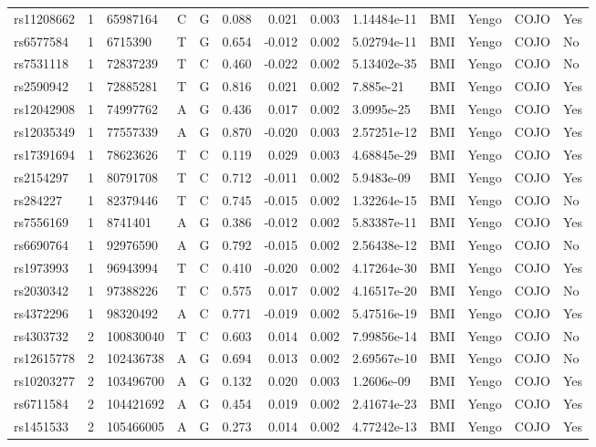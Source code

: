 \documentclass[11pt,twoside]{bristolthesis}
\begin{document}
\begin{longtable}[t]{lrlllrrrlllll}
rs11208662 & 1 & 65987164 & C & G & 0.088 & 0.021 & 0.003 & 1.14484e-11 & BMI & Yengo & COJO & Yes\\
\addlinespace
rs6577584 & 1 & 6715390 & T & G & 0.654 & -0.012 & 0.002 & 5.02794e-11 & BMI & Yengo & COJO & No\\
rs7531118 & 1 & 72837239 & T & C & 0.460 & -0.022 & 0.002 & 5.13402e-35 & BMI & Yengo & COJO & No\\
rs2590942 & 1 & 72885281 & T & G & 0.816 & 0.021 & 0.002 & 7.885e-21 & BMI & Yengo & COJO & Yes\\
rs12042908 & 1 & 74997762 & A & G & 0.436 & 0.017 & 0.002 & 3.0995e-25 & BMI & Yengo & COJO & Yes\\
rs12035349 & 1 & 77557339 & A & G & 0.870 & -0.020 & 0.003 & 2.57251e-12 & BMI & Yengo & COJO & Yes\\
\addlinespace
rs17391694 & 1 & 78623626 & T & C & 0.119 & 0.029 & 0.003 & 4.68845e-29 & BMI & Yengo & COJO & Yes\\
rs2154297 & 1 & 80791708 & T & C & 0.712 & -0.011 & 0.002 & 5.9483e-09 & BMI & Yengo & COJO & Yes\\
rs284227 & 1 & 82379446 & T & C & 0.745 & -0.015 & 0.002 & 1.32264e-15 & BMI & Yengo & COJO & No\\
rs7556169 & 1 & 8741401 & A & G & 0.386 & -0.012 & 0.002 & 5.83387e-11 & BMI & Yengo & COJO & Yes\\
rs6690764 & 1 & 92976590 & A & G & 0.792 & -0.015 & 0.002 & 2.56438e-12 & BMI & Yengo & COJO & No\\
\addlinespace
rs1973993 & 1 & 96943994 & T & C & 0.410 & -0.020 & 0.002 & 4.17264e-30 & BMI & Yengo & COJO & Yes\\
rs2030342 & 1 & 97388226 & T & C & 0.575 & 0.017 & 0.002 & 4.16517e-20 & BMI & Yengo & COJO & No\\
rs4372296 & 1 & 98320492 & A & C & 0.771 & -0.019 & 0.002 & 5.47516e-19 & BMI & Yengo & COJO & Yes\\
rs4303732 & 2 & 100830040 & T & C & 0.603 & 0.014 & 0.002 & 7.99856e-14 & BMI & Yengo & COJO & No\\
rs12615778 & 2 & 102436738 & A & G & 0.694 & 0.013 & 0.002 & 2.69567e-10 & BMI & Yengo & COJO & No\\
\addlinespace
rs10203277 & 2 & 103496700 & A & G & 0.132 & 0.020 & 0.003 & 1.2606e-09 & BMI & Yengo & COJO & Yes\\
rs6711584 & 2 & 104421692 & A & G & 0.454 & 0.019 & 0.002 & 2.41674e-23 & BMI & Yengo & COJO & Yes\\
rs1451533 & 2 & 105466005 & A & G & 0.273 & 0.014 & 0.002 & 4.77242e-13 & BMI & Yengo & COJO & Yes\\

\end{longtable}
\end{document}
